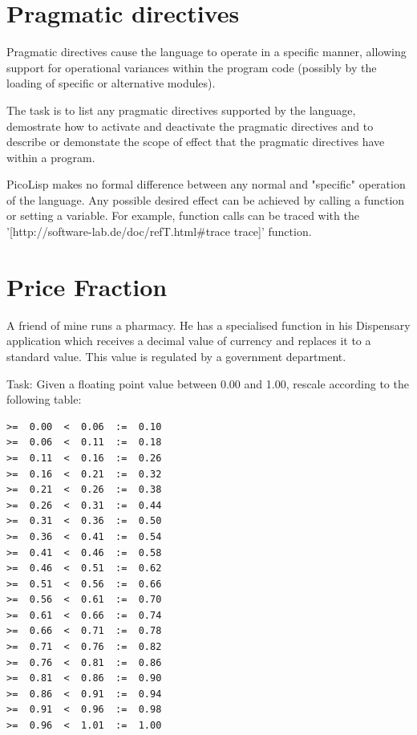 \pagebreak{}
\section*{Pragmatic directives}

Pragmatic directives cause the language to operate in a specific manner,
allowing support for operational variances within the program code
(possibly by the loading of specific or alternative modules).

The task is to list any pragmatic directives supported by the language,
demostrate how to activate and deactivate the pragmatic directives and
to describe or demonstate the scope of effect that the pragmatic
directives have within a program.

\begin{wideverbatim}

PicoLisp makes no formal difference between any normal and "specific" operation
of the language. Any possible desired effect can be achieved by calling a
function or setting a variable. For example, function calls can be traced with
the '[http://software-lab.de/doc/refT.html#trace trace]' function.

\end{wideverbatim}

\pagebreak{}
\section*{Price Fraction}

A friend of mine runs a pharmacy. He has a specialised function in his
Dispensary application which receives a decimal value of currency and
replaces it to a standard value. This value is regulated by a government
department.

Task: Given a floating point value between 0.00 and 1.00, rescale
according to the following table:

\begin{verbatim}
>=  0.00  <  0.06  :=  0.10
>=  0.06  <  0.11  :=  0.18
>=  0.11  <  0.16  :=  0.26
>=  0.16  <  0.21  :=  0.32
>=  0.21  <  0.26  :=  0.38
>=  0.26  <  0.31  :=  0.44
>=  0.31  <  0.36  :=  0.50
>=  0.36  <  0.41  :=  0.54
>=  0.41  <  0.46  :=  0.58
>=  0.46  <  0.51  :=  0.62
>=  0.51  <  0.56  :=  0.66
>=  0.56  <  0.61  :=  0.70
>=  0.61  <  0.66  :=  0.74
>=  0.66  <  0.71  :=  0.78
>=  0.71  <  0.76  :=  0.82
>=  0.76  <  0.81  :=  0.86
>=  0.81  <  0.86  :=  0.90
>=  0.86  <  0.91  :=  0.94
>=  0.91  <  0.96  :=  0.98
>=  0.96  <  1.01  :=  1.00
\end{verbatim}

